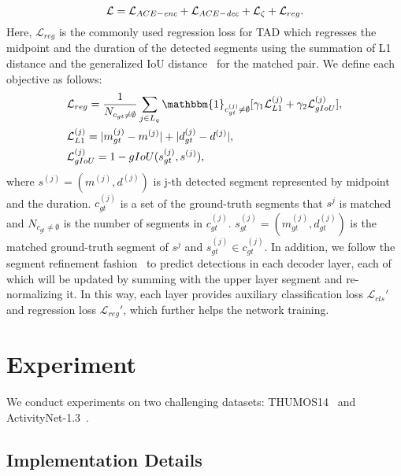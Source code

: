 \documentclass[runningheads]{llncs}
\newcommand{\mc}[1]{\mathcal{#1}}
\begin{document}
\begin{equation}
    \mc{L}=\mc{L}_{ACE-\emph{enc}} + \mc{L}_{ACE-\emph{dec}} + \mc{L}_\zeta + \mc{L}_{reg}.
\end{equation} 
Here, $\mc{L}_{reg}$ is the commonly used regression loss for TAD which regresses the midpoint and the duration of the detected segments using the summation of L1 distance and the generalized IoU distance~\cite{rezatofighi2019generalized} for the matched pair. We define each objective as follows:
\begin{equation}
    \begin{split}
         &\mc{L}_{reg}=\frac{1}{N_{c_{gt}\neq \emptyset}}
        \sum_{j\in L_q}\mathbbm{1}_{c_{gt}^{(j)}\neq \emptyset}[\gamma_1\mc{L}_{L1}^{(j)} + \gamma_2\mc{L}_{gIoU}^{(j)}],\\
         &\mc{L}_{L1}^{(j)}= |m_{gt}^{(j)}-m^{(j)}|+|d_{gt}^{(j)}-d^{(j)}|,\\
         &\mc{L}_{gIoU}^{(j)} = 1-gIoU(s_{gt}^{(j)},s^{(j)}),\\
    \end{split}
\end{equation} 
where $s^{(j)}=(m^{(j)},d^{(j)})$ is j-th detected segment represented by midpoint and the duration. $c_{gt}^{(j)}$ is a set of the ground-truth segments that $s^{j}$ is matched and $N_{c_{gt}\neq \emptyset}$ is the number of segments in $c_{gt}^{(j)}$. $s_{gt}^{(j)}=(m_{gt}^{(j)},d_{gt}^{(j)})$ is the matched ground-truth segment of $s^{j}$ and $s_{gt}^{(j)} \in c_{gt}^{(j)}$. In addition, we follow the segment refinement fashion~\cite{zhu2020deformable,liu2021end} to predict detections in each decoder layer, each of which will be updated by summing with the upper layer segment and re-normalizing it. In this way, each layer provides auxiliary classification loss $\mc{L}_{cls}'$ and regression loss $\mc{L}_{reg}'$, which  further helps the network training.



\section{Experiment}
We conduct experiments on two challenging datasets: THUMOS14~\cite{THUMOS14} and ActivityNet-1.3~\cite{caba2015activitynet}.



\subsection{Implementation Details} 
\end{document}
